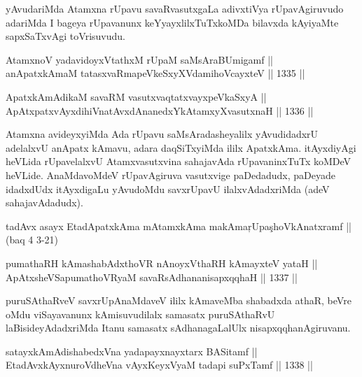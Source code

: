 \begin{artha}
yAvudariMda Atamxna rUpavu savaRvasutxgaLa adivxtiVya rUpavAgiruvudo adariMda I bageya rUpavanunx keYyayxlilxTuTxkoMDa bilavxda kAyiyaMte sapxSaTxvAgi toVrisuvudu.
\end{artha}


\begin{shl}
AtamxnoV yadavidoyxVtathxM rUpaM saMsAraBUmigamf || \\
anApatxkAmaM tatasxvaRmapeVkeSxyXVdamihoVcayxteV \hfill || 1335 ||  
\end{shl}
				
\begin{shl}
ApatxkAmAdikaM savaRM vasutxvaqtatxvayxpeVkaSxyA || \\
ApAtxpatxvAyxdihiVnatAvxdAnanedxYkAtamxyXvasutxnaH \hfill || 1336 ||  
\end{shl}

\begin{artha}
Atamxna avideyxyiMda Ada rUpavu saMsAradasheyalilx yAvudidadxrU adelalxvU anApatx kAmavu, adara daqSiTxyiMda ililx ApatxkAma. itAyxdiyAgi heVLida rUpavelalxvU Atamxvasutxvina sahajavAda rUpavaninxTuTx koMDeV heVLide. AnaMdavoMdeV rUpavAgiruva vasutxvige paDedadudx, paDeyade idadxdUdx itAyxdigaLu yAvudoMdu savxrUpavU ilalxvAdadxriMda (adeV sahajavAdadudx).

tadAvx asayx EtadApatxkAma mAtamxkAma makAma\c rUpa\c shoVkAnatxramf || (baq 4 3-21)
\end{artha}


\begin{shl}
pumathaRH kAmashabAdxthoVR nAnoyxV\s thaRH kAmayxteV yataH || \\
ApAtxsheVSapumathoVR\s yaM savaRsAdhananisapxqqhaH \hfill || 1337 ||  
\end{shl}

\begin{artha}
puruSAthaRveV savxrUpAnaMdaveV ililx kAmaveMba shabadxda athaR, beVre oMdu viSayavanunx kAmisuvudilalx samasatx puruSAthaRvU laBisideyAdadxriMda Itanu samasatx sAdhanagaLalUlx nisapxqqhanAgiruvanu.
\end{artha}


\begin{shl}
satayxkAmAdishabedxVna yadapayxnayxtarx BASitamf || \\
EtadAvxkAyxnuroVdheVna vAyxKeyxVyaM tadapi suPxTamf \hfill || 1338 ||  
\end{shl}

